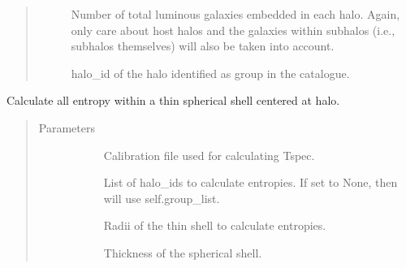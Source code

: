 \documentclass[letterpaper,10pt,english]{sphinxmanual}
\begin{document}
\begin{fulllineitems}
\begin{quote}
\begin{description}
\begin{description}
\item[{}] \leavevmode
Number of total luminous galaxies embedded in each halo. Again, 
only care about host halos and the galaxies within subhalos 
(i.e., subhalos themselves) will also be taken into account.

\item[{}] \leavevmode
halo\_id of the halo identified as group in the catalogue.

\end{description}

\end{description}\end{quote}

\begin{fulllineitems}
\label{\detokenize{halo_analysis:modules.halo_analysis.halo_props.calcu_entropy}}
Calculate all entropy within a thin spherical shell 
centered at halo.
\begin{quote}\begin{description}
\item[{Parameters}] \leavevmode\begin{description}
\item[{}] \leavevmode
Calibration file used for calculating Tspec.

\item[{}] \leavevmode
List of halo\_ids to calculate entropies. 
If set to None, then will use self.group\_list.

\item[{}] \leavevmode
Radii of the thin shell to calculate entropies.

\item[{}] \leavevmode
Thickness of the spherical shell.

\end{description}

\end{description}\end{quote}

\end{fulllineitems}


\end{fulllineitems}
\end{document}
